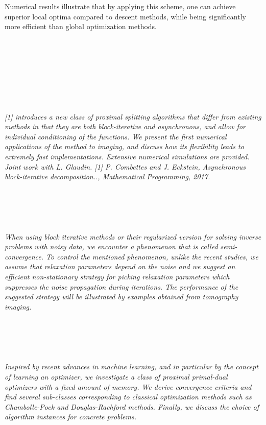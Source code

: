 \begin{multicols}{2}
{Numerical results illustrate that by applying this scheme, one can achieve superior local optima compared to descent methods, while being significantly more efficient than global optimization methods.}\\
\\ 
        \\
        \\\\
        \\
        \\\\
\\
      \textit{[1] introduces a new class of proximal splitting algorithms that 
differ from existing methods in that they are both block-iterative 
and asynchronous, and allow for individual conditioning of the 
functions. We present the first numerical applications of the
method to imaging, and discuss how its flexibility leads to
extremely fast implementations.  Extensive numerical simulations
are provided. Joint work with L.  Glaudin.
[1] P. Combettes and J. Eckstein, Asynchronous block-iterative
decomposition.., Mathematical Programming, 2017.}\\
\\ 
        \\
        \\\\
\\
      \textit{When using block iterative methods or their regularized version for solving inverse problems with noisy data, we encounter a phenomenon that is called semi-convergence. To control the mentioned phenomenon, unlike the recent studies, we assume that relaxation parameters depend on the noise and we suggest an efficient non-stationary strategy for picking relaxation parameters which suppresses the noise propagation during iterations. The performance of the suggested strategy will be illustrated by examples obtained from tomography imaging.}\\
\\ 
        \\
        \\\\
\\
      \textit{Inspired by recent advances in machine learning, and in particular by the concept of learning an optimizer, we investigate a class of proximal primal-dual optimizers with a fixed amount of memory. We derive convergence criteria and find several sub-classes corresponding to classical optimization methods such as Chambolle-Pock and Douglas-Rachford methods. Finally, we discuss the choice of algorithm instances for concrete problems.}\\

\end{multicols}
